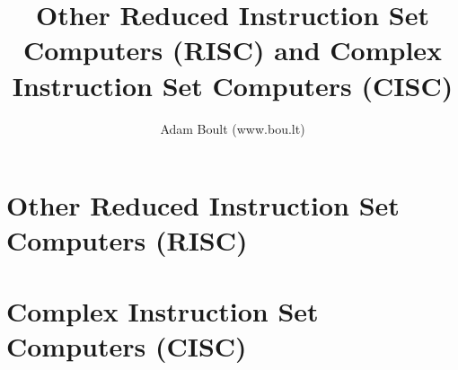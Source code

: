 \documentclass[oneside]{book}
\begin{document}
\author{Adam Boult (www.bou.lt)}
\title{Other Reduced Instruction Set Computers (RISC) and Complex Instruction Set Computers (CISC)}
\maketitle

\setcounter{tocdepth}{0}
\tableofcontents



\part{Other Reduced Instruction Set Computers (RISC)}








\part{Complex Instruction Set Computers (CISC)}






\end{document}
